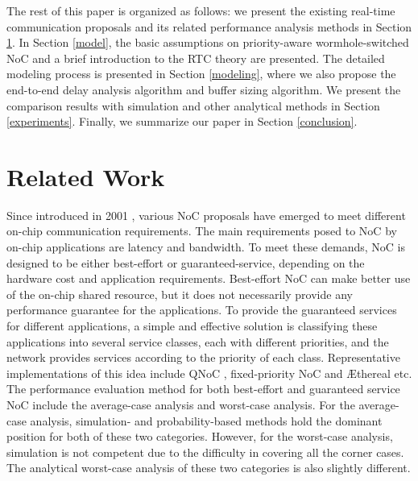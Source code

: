 \documentclass[preprint]{elsarticle}
\begin{document}
The rest of this paper is organized as follows: we present the existing real-time communication proposals and its related performance analysis methods in Section \ref{related}. In Section \ref{model}, the basic assumptions on priority-aware wormhole-switched NoC and a brief introduction to the RTC theory are presented. The detailed modeling process is presented in Section \ref{modeling}, where we also propose the end-to-end delay analysis algorithm and buffer sizing algorithm. We present the comparison results with simulation and other analytical methods in Section \ref{experiments}. Finally, we summarize our paper in Section \ref{conclusion}.

\section{Related Work}\label{related}
Since introduced in 2001 \cite{DaTo01}, various NoC proposals have emerged to meet different on-chip communication requirements. The main requirements posed to NoC by on-chip applications are latency and bandwidth. To meet these demands, NoC is designed to be either best-effort or guaranteed-service, depending on the hardware cost and application requirements. Best-effort NoC can make better use of the on-chip shared resource, but it does not necessarily provide any performance guarantee for the applications. To provide the guaranteed services for different applications, a simple and effective solution is classifying these applications into several service classes, each with different priorities, and the network provides services according to the priority of each class. Representative implementations of this idea include QNoC \cite{BCGK04}, fixed-priority NoC \cite{Shi:2008:RCA:1397757.1397996} and {{\AE}thereal} \cite{GoDR05} etc. The performance evaluation method for both best-effort and guaranteed service NoC include the average-case analysis and worst-case analysis. For the average-case analysis, simulation- and probability-based methods hold the dominant position for both of these two categories. However, for the worst-case analysis, simulation is not competent due to the difficulty in covering all the corner cases. The analytical worst-case analysis of these two categories is also slightly different.
\end{document}
